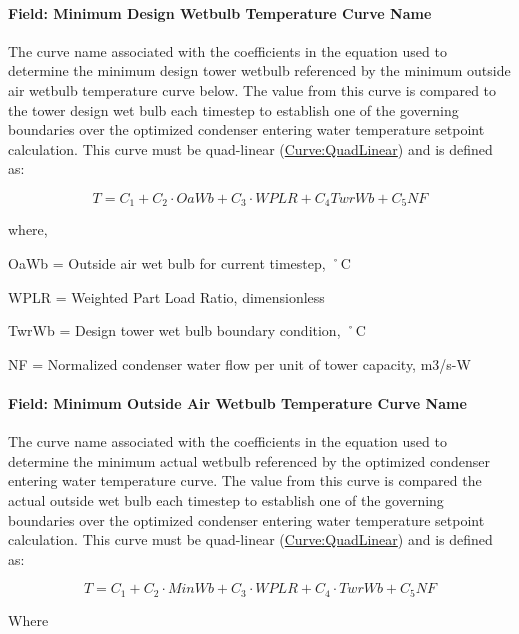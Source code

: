\paragraph{Field: Minimum Design Wetbulb Temperature Curve Name}\label{field-minimum-design-wetbulb-temperature-curve-name}

The curve name associated with the coefficients in the equation used to determine the minimum design tower wetbulb referenced by the minimum outside air wetbulb temperature curve below. The value from this curve is compared to the tower design wet bulb each timestep to establish one of the governing boundaries over the optimized condenser entering water temperature setpoint calculation. This curve must be quad-linear (\hyperref[curvequadlinear]{Curve:QuadLinear}) and is defined as:

\begin{equation}
T = {C_1} + {C_2}\cdot OaWb + {C_3}\cdot WPLR + {C_4}TwrWb + {C_5}NF
\end{equation}

where,

OaWb = Outside air wet bulb for current timestep, ˚C

WPLR = Weighted Part Load Ratio, dimensionless

TwrWb = Design tower wet bulb boundary condition, ˚C

NF = Normalized condenser water flow per unit of tower capacity, m3/s-W

\paragraph{Field: Minimum Outside Air Wetbulb Temperature Curve Name}\label{field-minimum-outside-air-wetbulb-temperature-curve-name}

The curve name associated with the coefficients in the equation used to determine the minimum actual wetbulb referenced by the optimized condenser entering water temperature curve. The value from this curve is compared the actual outside wet bulb each timestep to establish one of the governing boundaries over the optimized condenser entering water temperature setpoint calculation. This curve must be quad-linear (\hyperref[curvequadlinear]{Curve:QuadLinear}) and is defined as:

\begin{equation}
T = {C_1} + {C_2}\cdot MinWb + {C_3}\cdot WPLR + {C_4}\cdot TwrWb + {C_5}NF
\end{equation}

Where

